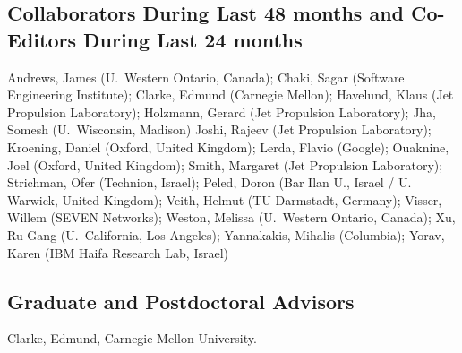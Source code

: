 \documentclass[fleqn,11pt]{article}
\renewcommand{\$}[1]{$#1$}
\begin{document}
\subsection*{Collaborators During Last 48 months and Co-Editors During Last 24 months}
Andrews, James (U.\ Western Ontario, Canada);
Chaki, Sagar (Software Engineering Institute);
Clarke, Edmund (Carnegie Mellon);
Havelund, Klaus (Jet Propulsion Laboratory);
Holzmann, Gerard (Jet Propulsion Laboratory);
Jha, Somesh (U.\ Wisconsin, Madison)
Joshi, Rajeev (Jet Propulsion Laboratory);
Kroening, Daniel (Oxford, United Kingdom);
Lerda, Flavio (Google);
Ouaknine, Joel (Oxford, United Kingdom);
Smith, Margaret (Jet Propulsion Laboratory);
Strichman, Ofer (Technion, Israel);
Peled, Doron (Bar Ilan U., Israel / U. Warwick, United Kingdom);
Veith, Helmut (TU Darmstadt, Germany);
Visser, Willem (SEVEN Networks);
Weston, Melissa (U.\ Western Ontario, Canada);
Xu, Ru-Gang (U.\ California, Los Angeles);
Yannakakis, Mihalis (Columbia);
Yorav, Karen (IBM Haifa Research Lab, Israel)

\subsection*{Graduate and Postdoctoral Advisors}

Clarke, Edmund, Carnegie Mellon University.
\end{document}
